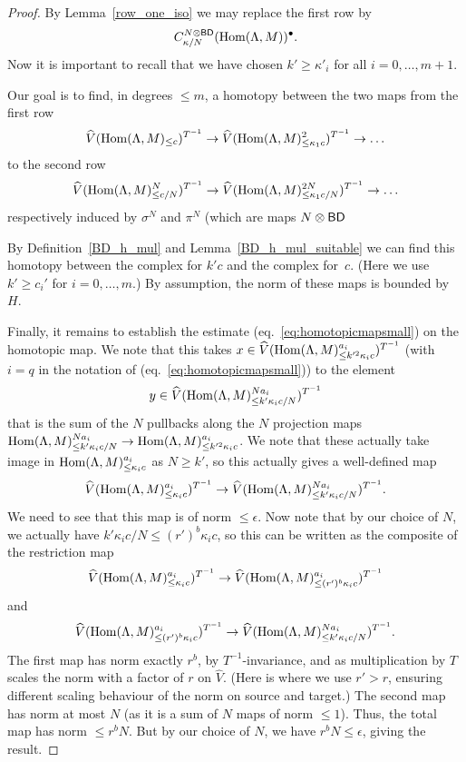 \begin{proof}
  \leanok
  By Lemma~\ref{row_one_iso} we may replace the first row by
  \[
    C^{N \otimes \mathsf{BD}}_{\kappa/N}(\operatorname{Hom}(\Lambda, M))^\bullet.
  \]
  Now it is important to recall that we have chosen $k' \ge \kappa'_i$ for all $i = 0, \dots, m+1$.

  Our goal is to find,
  in degrees $\leq m$, a homotopy between the two maps from the first row
  \[
    \widehat{V}(\operatorname{Hom}(\Lambda,M)_{\leq c})^{T^{-1}}\to \widehat{V}(\operatorname{Hom}(\Lambda,M)_{\leq \kappa_1c}^2)^{T^{-1}}\to \ldots
  \]
  to the second row
  \[
    \widehat{V}(\operatorname{Hom}(\Lambda,M)_{\leq c/N}^N)^{T^{-1}}\to \widehat{V}(\operatorname{Hom}(\Lambda,M)_{\leq \kappa_1c/N}^{2N})^{T^{-1}}\to \ldots
  \]
  respectively induced by $\sigma^N$ and $\pi^N$ (which are maps $N \otimes \mathsf{BD}$

  By Definition~\ref{BD_h_mul} and Lemma~\ref{BD_h_mul_suitable}
  we can find this homotopy between the complex for $k'c$ and the complex for~$c$.
  (Here we use $k'\geq c_i'$ for $i=0,\ldots,m$.)
  By assumption, the norm of these maps is bounded by~$H$.

  Finally, it remains to establish the estimate (eq.~\ref{eq:homotopicmapsmall}) on the homotopic map.
  We note that this takes $x\in \widehat{V}(\operatorname{Hom}(\Lambda,M)_{\leq k'^2\kappa_ic}^{a_i})^{T^{-1}}$
  (with $i=q$ in the notation of (eq.~\ref{eq:homotopicmapsmall})) to the element
  \[
    y\in \widehat{V}(\operatorname{Hom}(\Lambda,M)_{\leq k'\kappa_ic/N}^{Na_i})^{T^{-1}}
  \]
  that is the sum of the $N$ pullbacks along the $N$ projection maps
  $\operatorname{Hom}(\Lambda,M)_{\leq k'\kappa_ic/N}^{Na_i}\to \operatorname{Hom}(\Lambda,M)_{\leq k'^2\kappa_ic}^{a_i}$.
  We note that these actually take image in $\operatorname{Hom}(\Lambda,M)_{\leq \kappa_ic}^{a_i}$ as $N\geq k'$,
  so this actually gives a well-defined map
  \[
    \widehat{V}(\operatorname{Hom}(\Lambda,M)_{\leq \kappa_ic}^{a_i})^{T^{-1}} \to
    \widehat{V}(\operatorname{Hom}(\Lambda,M)_{\leq k'\kappa_ic/N}^{Na_i})^{T^{-1}}.
  \]
  We need to see that this map is of norm $\leq \epsilon$.
  Now note that by our choice of $N$, we actually have $k'\kappa_ic/N\leq (r')^b \kappa_ic$,
  so this can be written as the composite of the restriction map
  \[
    \widehat{V}(\operatorname{Hom}(\Lambda,M)_{\leq \kappa_ic}^{a_i})^{T^{-1}} \to
    \widehat{V}(\operatorname{Hom}(\Lambda,M)_{\leq (r')^b \kappa_ic}^{a_i})^{T^{-1}}
  \]
  and
  \[
    \widehat{V}(\operatorname{Hom}(\Lambda,M)_{\leq (r')^b \kappa_ic}^{a_i})^{T^{-1}} \to
    \widehat{V}(\operatorname{Hom}(\Lambda,M)_{\leq k'\kappa_ic/N}^{Na_i})^{T^{-1}}.
  \]
  The first map has norm exactly $r^b$, by $T^{-1}$-invariance,
  and as multiplication by $T$ scales the norm with a factor of $r$ on $\widehat{V}$.
  (Here is where we use $r'>r$, ensuring different scaling behaviour of the norm on source and target.)
  The second map has norm at most $N$ (as it is a sum of $N$ maps of norm $\leq 1$).
  Thus, the total map has norm $\leq r^bN$. But by our choice of $N$, we have $r^bN\leq \epsilon$, giving the result.
\end{proof}

